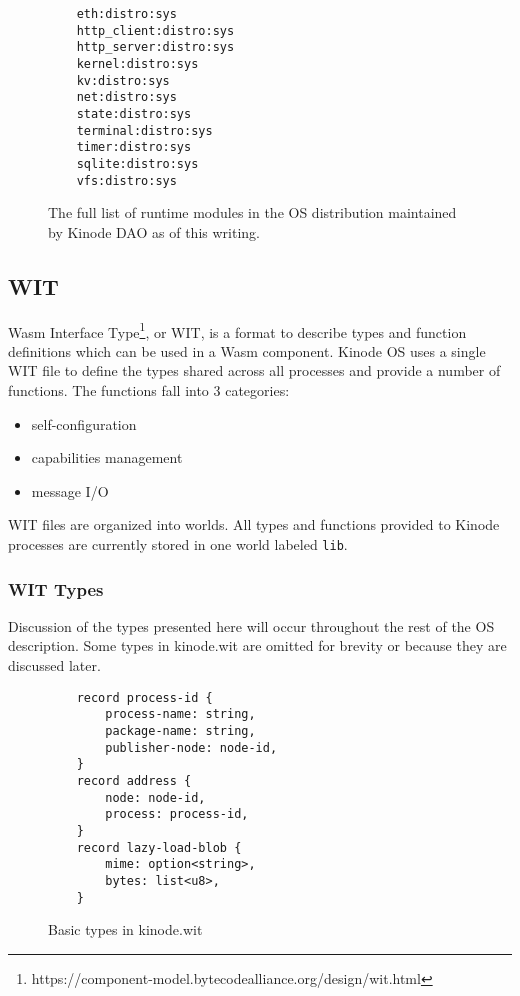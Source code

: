 \documentclass[runningheads]{llncs}
\begin{document}
\begin{figure}
    \centering
    \begin{lstlisting}
    eth:distro:sys
    http_client:distro:sys
    http_server:distro:sys
    kernel:distro:sys
    kv:distro:sys
    net:distro:sys
    state:distro:sys
    terminal:distro:sys
    timer:distro:sys
    sqlite:distro:sys
    vfs:distro:sys
    \end{lstlisting}
    \caption{The full list of runtime modules in the OS distribution maintained by Kinode DAO as of this writing.}
    \label{fig:runtime modules list}
\end{figure}

\subsection{WIT}

Wasm Interface Type\footnote{https://component-model.bytecodealliance.org/design/wit.html}, or WIT, is a format to describe types and function definitions which can be used in a Wasm component.
Kinode OS uses a single WIT file to define the types shared across all processes and provide a number of functions.
The functions fall into 3 categories:
\begin{itemize}
    \item self-configuration
    \item capabilities management
    \item message I/O
\end{itemize}

WIT files are organized into worlds. All types and functions provided to Kinode processes are currently stored in one world labeled \verb|lib|.

\subsubsection{WIT Types}

Discussion of the types presented here will occur throughout the rest of the OS description.
Some types in kinode.wit are omitted for brevity or because they are discussed later.

\begin{figure}[H]
    \centering
    \begin{lstlisting}
    record process-id {
        process-name: string,
        package-name: string,
        publisher-node: node-id,
    }
    record address {
        node: node-id,
        process: process-id,
    }
    record lazy-load-blob {
        mime: option<string>,
        bytes: list<u8>,
    }
    \end{lstlisting}
    \caption{Basic types in kinode.wit}
    \label{fig:WIT Types 1}
\end{figure}
\end{document}
